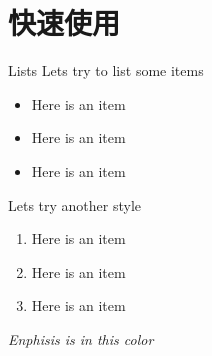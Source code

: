 
\section{快速使用}

\begin{frame}{Lists}
    Lets try to list some items
    \begin{itemize}
        \item Here is an item
        \item Here is an item
        \item Here is an item
    \end{itemize}

    \vspace{0.4cm} %
    
    Lets try another style
    \begin{enumerate}
        \item Here is an item
        \item Here is an item
        \item Here is an item
    \end{enumerate}

    \vspace{0.2cm}

     \emph{Enphisis is in this color}
\end{frame}
